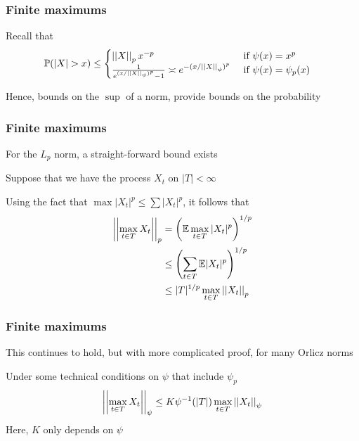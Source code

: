 \documentclass[12pt]{beamer}
\begin{document}

\begin{frame}[fragile]
\frametitle{Finite maximums}
Recall that 
\begin{align*}
\mathbb{P}(|X| > x) 
& \leq
\begin{cases}
\left|\left| X \right|\right|_px^{-p} & \textrm{ if } \psi(x) = x^p \\
\frac{1}{e^{(x/\left|\left| X \right|\right|_{\psi})^p}-1}  \asymp e^{-(x/\left|\left| X \right|\right|_{\psi})^{p}}&  \textrm{ if } \psi(x) = \psi_p(x)
\end{cases}
\end{align*}

Hence, bounds on the $\sup$ of a norm, provide bounds on the probability 
\end{frame}

\begin{frame}[fragile]
\frametitle{Finite maximums}
For the $L_p$ norm, a straight-forward bound exists

\vsp
Suppose that we have the process $X_t$ on $|T| < \infty$

\vsp
Using the fact that $\max |X_t|^p \leq \sum |X_t|^p$, it follows that
\begin{align*}
\left|\left| \max_{t \in T} X_t \right|\right|_p 
& =
\left( \mathbb{E} \max_{t\in T} |X_t|^p \right)^{1/p}  \\
& \leq 
\left(  \sum_{t\in T} \mathbb{E}|X_t|^p \right)^{1/p}  \\
 & \leq
|T|^{1/p} \max_{t\in T} \left|\left| X_t \right|\right|_p 
\end{align*}
\end{frame}

\begin{frame}[fragile]
\frametitle{Finite maximums}
This continues to hold, but with more complicated proof, for many Orlicz norms

\vsp
Under some technical conditions on $\psi$ that include $\psi_p$ 
\[
\left|\left| \max_{t \in T} X_t \right|\right|_\psi \leq K \psi^{-1}(|T|) \max_{t \in T} \left|\left| X_t \right|\right|_\psi
\]
Here, $K$ only depends on $\psi$
\end{frame}
\end{document}
